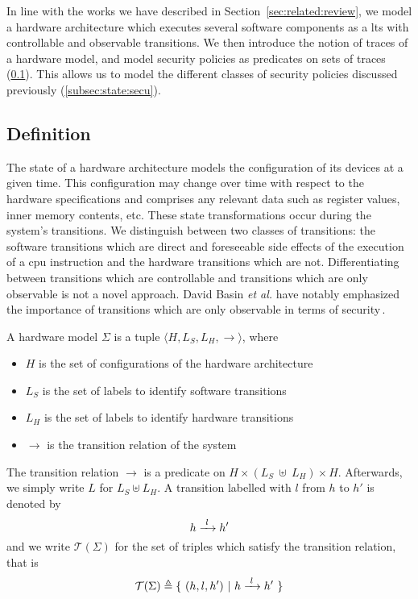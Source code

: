 In line with the works we have described in Section~\ref{sec:related:review}, we
model a hardware architecture which executes several software components as a
\ac{lts} with controllable and observable transitions.
%
We then introduce the notion of traces of a hardware model, and model security
policies as predicates on sets of traces
(\ref{subsec:speccert:def}).
%
This allows us to model the different classes of security policies discussed
previously (\ref{subsec:state:secu}).

\subsection{Definition}
\label{subsec:speccert:def}

The state of a hardware architecture models the configuration of its devices at
a given time.
%
This configuration may change over time with respect to the hardware
specifications and comprises any relevant data such as register values, inner
memory contents, etc.
%
These state transformations occur during the system's transitions.
%
We distinguish between two classes of transitions: the software transitions
which are direct and foreseeable side effects of the execution of a \ac{cpu}
instruction and the hardware transitions which are not.
%
Differentiating between transitions which are controllable and transitions which
are only observable is not a novel approach.
%
David Basin \emph{et al.} have notably emphasized the importance of transitions
which are only observable in terms of security\,\cite{basin2013enforceable}.

\begin{definition}
  \label{def:speccert:model}
  A hardware model $\Sigma$ is a tuple
  $\langle H, L_S, L_H, \rightarrow \rangle$, where
  \begin{itemize}
  \item $H$ is the set of configurations of the hardware architecture
  \item $L_S$ is the set of labels to identify software transitions
  \item $L_H$ is the set of labels to identify hardware transitions
  \item $\rightarrow$ is the transition relation of the system
  \end{itemize}

  The transition relation $\rightarrow$ is a predicate on
  $H \times (L_S~\uplus~L_H) \times H$.
  Afterwards, we simply write $L$ for $L_S \uplus L_H$.
  A transition labelled with $l$ from $h$ to $h'$ is denoted by
  \[
    h \xrightarrow{\hskip0.3em\relax l\hskip0.3em\relax} h'
  \]
  and we write $\mathcal{T}(\Sigma)$ for the set of triples which satisfy the
  transition relation, that is
  \[
    \mathcal{T}(\Sigma) \triangleq \{\ (h, l, h')\ |\ h \xrightarrow{\hskip0.3em\relax l\hskip0.3em\relax} h'\ \}
  \]
\end{definition}

